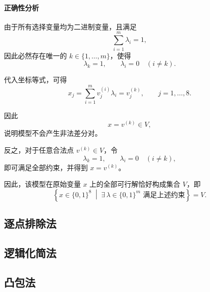 \paragraph{正确性分析}

由于所有选择变量均为二进制变量，且满足
\[
\sum_{i=1}^{m}\lambda_i=1,
\]
因此必然存在唯一的 $k\in\{1,\ldots,m\}$，使得
\[
\lambda_k=1,\qquad
\lambda_i=0\quad(i\ne k).
\]

代入坐标等式，可得
\[
x_j
=\sum_{i=1}^{m}v_j^{(i)}\lambda_i
=v_j^{(k)},
\qquad j=1,\ldots,8.
\]

因此
\[
x=v^{(k)}\in V,
\]
说明模型不会产生非法差分对。

反之，对于任意合法点 $v^{(k)}\in V$，令
\[
\lambda_k=1,\qquad
\lambda_i=0\quad(i\ne k),
\]
即可满足全部约束，并得到 $x=v^{(k)}$。

因此，该模型在原始变量 $x$ 上的全部可行解恰好构成集合 $V$，即
\[
\boxed{
\left\{
x\in\{0,1\}^{8}
\;\middle|\;
\exists\,\lambda\in\{0,1\}^{m}
\text{ 满足上述约束}
\right\}=V.
}
\]

\subsection{逐点排除法}

\subsection{逻辑化简法}
\subsection{凸包法}
